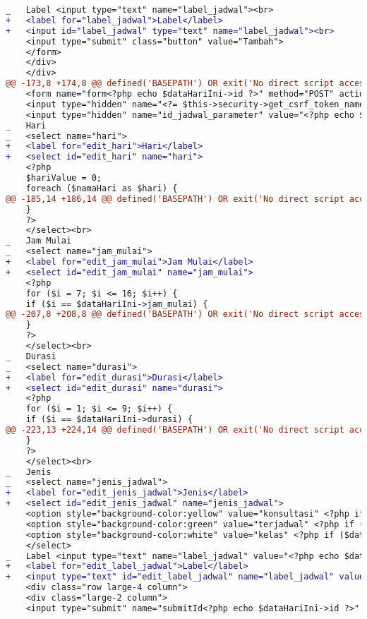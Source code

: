 \begin{itemize}
\begin{lstlisting}[frame=single, label={lst:perbaikan_1.3.1_label_masukan_entri_jadwal_dosen}, language=diff, caption=Perbaikan Kriteria Sukses 1.3.1 pada Kolom \textit{Input} di Halaman Entri Jadwal Dosen]
_   Label <input type="text" name="label_jadwal"><br>
+   <label for="label_jadwal">Label</label>
+   <input id="label_jadwal" type="text" name="label_jadwal"><br>
    <input type="submit" class="button" value="Tambah">
    </form>
    </div>
    </div>
@@ -173,8 +174,8 @@ defined('BASEPATH') OR exit('No direct script access allowed');
    <form name="form<?php echo $dataHariIni->id ?>" method="POST" action="/EntriJadwalDosen/update/<?php echo $dataHariIni->id ?>">
    <input type="hidden" name="<?= $this->security->get_csrf_token_name() ?>" value="<?= $this->security->get_csrf_hash() ?>" />
    <input type="hidden" name="id_jadwal_parameter" value="<?php echo $dataHariIni->id ?>"> </a> <br>
_   Hari 
_   <select name="hari"> 
+   <label for="edit_hari">Hari</label>
+   <select id="edit_hari" name="hari"> 
    <?php
    $hariValue = 0;
    foreach ($namaHari as $hari) {
@@ -185,14 +186,14 @@ defined('BASEPATH') OR exit('No direct script access allowed');
    }
    ?>
    </select><br>
_   Jam Mulai
_   <select name="jam_mulai"> 
+   <label for="edit_jam_mulai">Jam Mulai</label>
+   <select id="edit_jam_mulai" name="jam_mulai"> 
    <?php
    for ($i = 7; $i <= 16; $i++) {
    if ($i == $dataHariIni->jam_mulai) {
@@ -207,8 +208,8 @@ defined('BASEPATH') OR exit('No direct script access allowed');
    }
    ?>
    </select><br>
_   Durasi
_   <select name="durasi"> 
+   <label for="edit_durasi">Durasi</label>
+   <select id="edit_durasi" name="durasi"> 
    <?php
    for ($i = 1; $i <= 9; $i++) {
    if ($i == $dataHariIni->durasi) {
@@ -223,13 +224,14 @@ defined('BASEPATH') OR exit('No direct script access allowed');
    }
    ?>
    </select><br>
_   Jenis  
_   <select name="jenis_jadwal"> 
+   <label for="edit_jenis_jadwal">Jenis</label>
+   <select id="edit_jenis_jadwal" name="jenis_jadwal"> 
    <option style="background-color:yellow" value="konsultasi" <?php if ($dataHariIni->jenis == 'konsultasi') echo "selected"; ?> > Konsultasi </option>
    <option style="background-color:green" value="terjadwal" <?php if ($dataHariIni->jenis == 'terjadwal') echo "selected"; ?>> Terjadwal</option>
    <option style="background-color:white" value="kelas" <?php if ($dataHariIni->jenis == 'kelas') echo "selected"; ?>> Kelas </option>
    </select>
_   Label <input type="text" name="label_jadwal" value="<?php echo $dataHariIni->label; ?>"><br> 
+   <label for="edit_label_jadwal">Label</label>
+   <input type="text" id="edit_label_jadwal" name="label_jadwal" value="<?php echo $dataHariIni->label; ?>"><br> 
    <div class="row large-4 column">
    <div class="large-2 column">
    <input type="submit" name="submitId<?php echo $dataHariIni->id ?>" class="button" value="Save  ">
\end{lstlisting}
\end{itemize}

